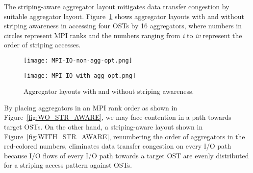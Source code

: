 \documentclass{jhps}
\begin{document}
The striping-aware aggregator layout mitigates data transfer congestion
by suitable aggregator layout.
Figure~\ref{fig:AGG_STR_AWARE} shows aggregator layouts with and
without striping awareness in accessing four OSTs by 16 aggregators,
where numbers in circles represent MPI ranks
and the numbers ranging from {\itshape i} to {\itshape iv} represent
the order of striping accesses.
%
\begin{figure}[tb]
\centering
\begin{minipage}[t]{0.42\textwidth}
\centering
\texttt{[image: MPI-IO-non-agg-opt.png]}
\label{fig:WO_STR_AWARE}
\end{minipage}
\noindent
\begin{minipage}[t]{0.42\textwidth}
\centering
\texttt{[image: MPI-IO-with-agg-opt.png]}
\label{fig:WITH_STR_AWARE}
\end{minipage}
\caption{Aggregator layouts with and without striping awareness.}
\label{fig:AGG_STR_AWARE}
\end{figure}
%
By placing aggregators in an MPI rank order
as shown in Figure~\ref{fig:WO_STR_AWARE},
we may face contention in a path towards target OSTs.
On the other hand, a striping-aware layout shown in
Figure~\ref{fig:WITH_STR_AWARE},
renumbering the order of aggregators in the red-colored numbers,
eliminates data transfer congestion on every I/O path
because I/O flows of every I/O path towards a target OST are
evenly distributed for a striping access pattern against OSTs.
\end{document}
